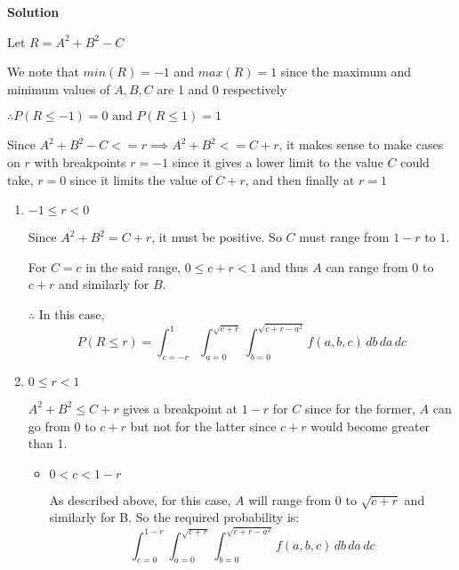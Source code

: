 \documentclass[12pt, oneside]{article}
\begin{document}
\begin{enumerate}
{    \textbf{Solution}

    Let \(R = A^2 + B^2 - C\)

    We note that \(min(R) = -1\) and \(max(R) = 1\) since the maximum and minimum values
    of \(A, B, C\) are 1 and 0 respectively

    \(\therefore P(R \leq -1) = 0 \text{ and } P(R \leq 1) = 1\)

    Since \(A^2 + B^2 - C <= r \implies A^2 + B^2 <= C + r\), it makes sense to make
    cases on \(r\) with breakpoints \(r = -1\) since it gives a lower limit to the value
    \(C\) could take, \(r = 0\) since it limits the value of \(C + r\), and then finally
    at \(r = 1\)

    \begin{enumerate}
        \item {
            \(-1 \leq r < 0\)

            Since \(A^2 + B^2 = C + r\), it must be positive. So \(C\) must range from
            \(1 - r\) to \(1\). 

            For \(C = c\) in the said range, \(0 \leq c + r < 1\) and thus \(A\) can
            range from 0 to \(c + r\) and similarly for \(B\).

            \(\therefore\) In this case,
            \[
                P(R \leq r) = \int_{c = -r}^{1} \int_{a=0}^{\sqrt{c + r}} 
                              \int_{b = 0}^{\sqrt{c + r - a^2}} f(a, b, c)\, db\, da\, dc
            \]
        }

        \item {
            \(0 \leq r < 1\)

            \(A^2 + B^2 \leq C + r\) gives a breakpoint at \(1 - r\) for \(C\) since
            for the former, \(A\) can go from \(0 \text{ to } c + r\) but not for the
            latter since \(c + r\) would become greater than 1.

            \begin{itemize}
                \item {
                    \(0 < c < 1 - r\)

                    As described above, for this case, \(A\) will range from 0 to 
                    \(\sqrt{c + r}\) and similarly for B.
                    So the required probability is:
                    \[
                        \int_{c = 0}^{1 - r} \int_{a=0}^{\sqrt{c + r}} 
                        \int_{b = 0}^{\sqrt{c + r - a^2}} f(a, b, c)\, db\, da\, dc
                    \]
                }


\end{itemize}}
\end{enumerate}}
\end{enumerate}
\end{document}
